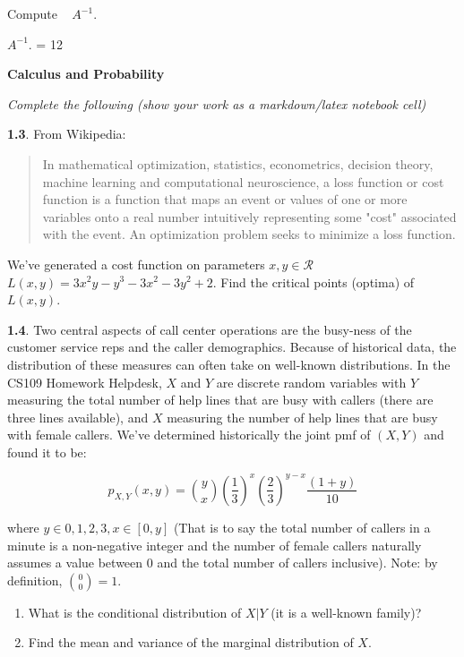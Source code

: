 \documentclass[11pt]{article}
\begin{document}
Compute ~ \(A^{-1}\).

\(A^{-1}\). = 12

    \textbf{Calculus and Probability}

\emph{Complete the following (show your work as a markdown/latex
notebook cell)}

\textbf{1.3}. From Wikipedia:

\begin{quote}
In mathematical optimization, statistics, econometrics, decision theory,
machine learning and computational neuroscience, a loss function or cost
function is a function that maps an event or values of one or more
variables onto a real number intuitively representing some "cost"
associated with the event. An optimization problem seeks to minimize a
loss function.
\end{quote}

We've generated a cost function on parameters \(x,y \in \mathcal{R}\)
\(L(x,y)= 3x^2y - y^3 - 3x^2 - 3y^2 + 2\). Find the critical points
(optima) of \(L(x,y)\).

\textbf{1.4}. Two central aspects of call center operations are the
busy-ness of the customer service reps and the caller demographics.
Because of historical data, the distribution of these measures can often
take on well-known distributions. In the CS109 Homework Helpdesk, \(X\)
and \(Y\) are discrete random variables with \(Y\) measuring the total
number of help lines that are busy with callers (there are three lines
available), and \(X\) measuring the number of help lines that are busy
with female callers. We've determined historically the joint pmf of
\((X, Y)\) and found it to be:

\[p_{X,Y}(x,y) = {y \choose x}\left(\frac{1}{3}\right)^x\left(\frac{2}{3}\right)^{y-x}\frac{(1+y)}{10}\]

where \(y \in {0,1,2,3}, x \in [0, y]\) (That is to say the total number
of callers in a minute is a non-negative integer and the number of
female callers naturally assumes a value between 0 and the total number
of callers inclusive). Note: by definition, \({0 \choose 0} = 1\).

\begin{enumerate}
\def\labelenumi{(\roman{enumi})}
\item
  What is the conditional distribution of \(X|Y\) (it is a well-known
  family)?
\item
  Find the mean and variance of the marginal distribution of \(X\).
\end{enumerate}
\end{document}
